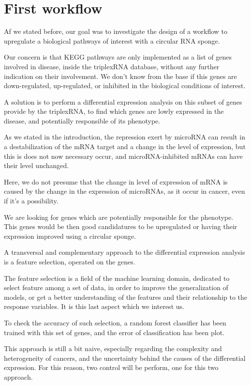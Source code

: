 \documentclass[a4paper,12pt]{report}
\begin{document}
\section{First workflow}

Af we stated before, our goal was to investigate the design of a workflow to upregulate a biological pathways of interest with a circular RNA sponge.

Our concern is that KEGG pathways are only implemented as a list of genes involved in disease, inside the triplexRNA database\cite{triplex}, without any further indication on their involvement. We don't know from the base if this genes are down-regulated, up-regulated, or inhibited in the biological conditions of interest. 

A solution is to perform a differential expression analysis on this subset of genes provide by the triplexRNA, to find which genes are lowly expressed in the disease, and potentially responsible of its phenotype.

As we stated in the introduction, the repression exert by microRNA can result in a destabilization of the mRNA target and a change in the level of expression, but this is does not now necessary occur, and microRNA-inhibited mRNAs can have their level unchanged.

Here, we do not presume that the change in level of expression of mRNA is caused by the change in the expression of microRNAs, as it occur in cancer\cite{cancer}, even if it's a possibility. 

We are looking for genes which are potentially responsible for the phenotype. This genes would be then good candidatures to be upregulated or having their expression improved using a circular sponge.

A transversal and complementary approach to the differential expression analysis is a feature selection, operated on the genes.

The feature selection is a field of the machine learning domain\cite{springer}, dedicated to select feature among a set of data, in order to improve the generalization of models, or get a better understanding of the features and their relationship to the response variables\cite{springer}. It is this last aspect which we interest us.

To check the accuracy of such selection, a random forest classifier \cite{springer} has been trained with this set of genes, and the error of classification has been plot.

This approach is still a bit naive, especially regarding the complexity and heterogeneity of cancers\cite{TGCA, complexity}, and the uncertainty behind the causes of the differential expression. For this reason, two control will be perform, one for this two approach.
\end{document}
